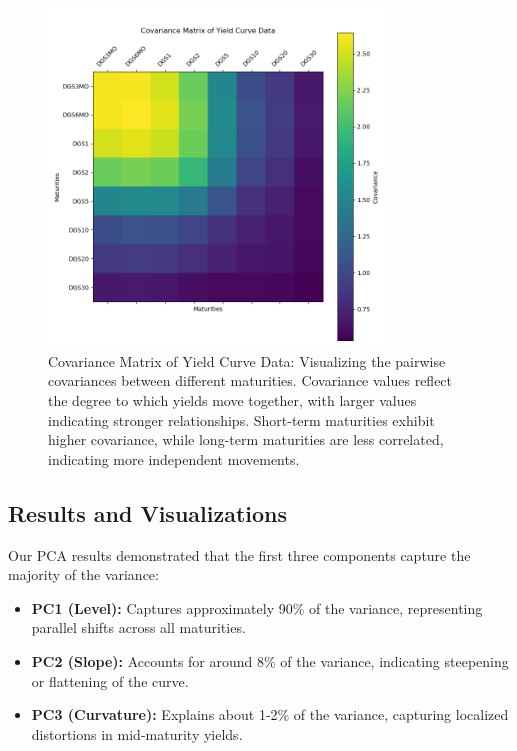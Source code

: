\documentclass[12pt]{article}
\begin{document}
\begin{figure}[H]
    \centering
    \includegraphics[width=0.8\textwidth]{visuals/covariance_matrix.png}
    \caption{Covariance Matrix of Yield Curve Data: Visualizing the pairwise covariances between different maturities. Covariance values reflect the degree to which yields move together, with larger values indicating stronger relationships. Short-term maturities exhibit higher covariance, while long-term maturities are less correlated, indicating more independent movements.}
    \label{fig:covariance_matrix}
\end{figure}



\subsection{Results and Visualizations}

Our PCA results demonstrated that the first three components capture the majority of the variance:
\begin{itemize}
    \item \textbf{PC1 (Level):} Captures approximately 90\% of the variance, representing parallel shifts across all maturities.
    \item \textbf{PC2 (Slope):} Accounts for around 8\% of the variance, indicating steepening or flattening of the curve.
    \item \textbf{PC3 (Curvature):} Explains about 1-2\% of the variance, capturing localized distortions in mid-maturity yields.
\end{itemize}
\end{document}
